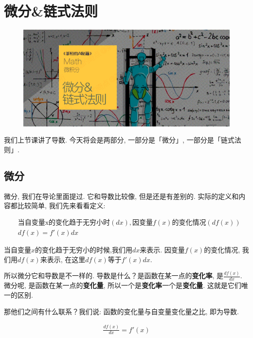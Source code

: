 \chapter{微分\&链式法则}

\begin{figure}[ht]
  \centering
  \includegraphics[width=1\linewidth]{asset/茶桁的AI秘籍_Math_10.png}
\end{figure}

\newpage

我们上节课讲了导数. 今天将会是两部分, 一部分是「微分」, 一部分是「链式法则」. 

\section{微分}

微分, 我们在导论里面提过. 它和导数比较像, 但是还是有差别的. 实际的定义和内容都比较简单, 我们先来看看定义:

\begin{align*}
  & \mbox{当自变量x的变化趋于无穷小时}(dx), \mbox{因变量}f(x)\mbox{的变化情况}(df(x)) \\
  & df(x) = f'(x)dx
\end{align*}

当自变量$x$的变化趋于无穷小的时候,我们用$dx$来表示. 因变量$f(x)$的变化情况, 我们用$df(x)$来表示, 在这里$df(x)$等于$f'(x)dx$. 

所以微分它和导数是不一样的. 导数是什么？是函数在某一点的\textbf{变化率}, 是$\frac{df(x)}{dx}$. 微分呢, 是函数在某一点的\textbf{变化量}, 所以一个是\textbf{变化率}一个是\textbf{变化量}. 这就是它们唯一的区别. 

那他们之间有什么联系？我们说: 函数的变化量与自变量变化量之比, 即为导数. 

\begin{align*}
  \frac{df(x)}{dx} = f'(x)
\end{align*}

